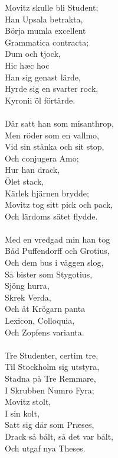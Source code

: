 \vspace{10pt}
Movitz skulle bli Student;\\
Han Upsala betrakta,\\
Börja mumla excellent\\
Grammatica contracta;\\
	Dum och tjock,\\
	Hic hæc hoc\\
	Han sig genast lärde,\\
Hyrde sig en svarter rock,\\
Kyronii öl förtärde.\\
\\
Där satt han som misanthrop,\\
Men röder som en vallmo,\\
Vid sin stånka och sit stop,\\
Och conjugera Amo;\\
	Hur han drack,\\
	Ölet stack,\\
	Kärlek hjärnen brydde;\\
Movitz tog sitt pick och pack,\\
Och lärdoms sätet flydde.\\
\\
Med en vredgad min han tog\\
Båd Puffendorff och Grotius,\\
Och dem bus i väggen slog,\\
Så bister som Stygotius,\\
	Sjöng hurra,\\
	Skrek Verda,\\
	Och åt Krögarn panta\\
Lexicon, Colloquia,\\
Och Zopfens varianta.\\
\\
Tre Studenter, certim tre,\\
Til Stockholm sig utstyra,\\
Stadna på Tre Remmare,\\
I Skrubben Numro Fyra;\\
	Movitz stolt,\\
	I sin kolt,\\
	Satt sig där som Præses,\\
Drack så bålt, så det var bålt,\\
Och utgaf nya Theses.\\
\\
